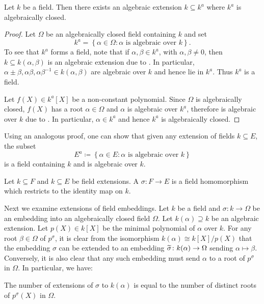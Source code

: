\begin{corollary}
    Let $k$ be a field. Then there exists an algebraic extension $k\subseteq k^a$ where $k^a$ is algebraically closed.
\end{corollary}
\begin{proof}
    Let $\Omega$ be an algebraically closed field containing $k$ and set 
    \begin{equation*}
        k^a = \left\{\alpha\in \Omega\colon \alpha\text{ is algebraic over } k\right\}.
    \end{equation*}
    To see that $k^a$ forms a field, note that if $\alpha,\beta\in k^a$, with $\alpha,\beta\ne 0$, then $k\subseteq k(\alpha,\beta)$ is an algebraic extension due to . In particular, $\alpha\pm\beta, \alpha\beta, \alpha\beta^{-1}\in k(\alpha,\beta)$ are algebraic over $k$ and hence lie in $k^a$. Thus $k^a$ is a field. 

    Let $f(X)\in k^a[X]$ be a non-constant polynomial. Since $\Omega$ is algebraically closed, $f(X)$ has a root $\alpha\in\Omega$ and $\alpha$ is algebraic over $k^a$, therefore is algebraic over $k$ due to . In particular, $\alpha\in k^a$ and hence $k^a$ is algebraically closed.
\end{proof}

\begin{remark}
    Using an analogous proof, one can show that given any extension of fields $k\subseteq E$, the subset 
    \begin{equation*}
        E^a \coloneq\left\{\alpha\in E\colon\alpha\text{ is algebraic over }k\right\}
    \end{equation*}
    is a field containing $k$ and is algebraic over $k$.
\end{remark}

\begin{definition}
    Let $k\subseteq F$ and $k\subseteq E$ be field extensions. A  $\sigma\colon F\to E$ is a field homomorphism which restricts to the identity map on $k$.
\end{definition}

Next we examine extensions of field embeddings. Let $k$ be a field and $\sigma\colon k\to\Omega$ be an embedding into an algebraically closed field $\Omega$. Let $k(\alpha)\supseteq k$ be an algebraic extension. Let $p(X)\in k[X]$ be the minimal polynomial of $\alpha$ over $k$. For any root $\beta\in\Omega$ of $p^\sigma$, it is clear from the isomorphism $k(\alpha)\cong k[X]/p(X)$ that the embedding $\sigma$ can be extended to an embedding $\widetilde{\sigma}\colon k(\alpha)\to\Omega$ sending $\alpha\mapsto\beta$. Conversely, it is also clear that any such embedding must send $\alpha$ to a root of $p^\sigma$ in $\Omega$. In particular, we have: 
\begin{lemma}
    The number of extensions of $\sigma$ to $k(\alpha)$ is equal to the number of distinct roots of $p^\sigma(X)$ in $\Omega$.
\end{lemma}

